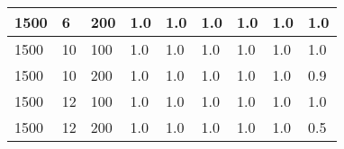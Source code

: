 \begin{table}[H]
\begin{tabular}{|l|l|l|l|l|l|l|l|l|}
1500                    & 6                      & 200                    & 1.0                        & 1.0                       & 1.0                             & 1.0                       & 1.0                           & 1.0                            \\ \hline
1500                    & 10                     & 100                    & 1.0                        & 1.0                       & 1.0                             & 1.0                       & 1.0                           & 1.0                            \\ \hline
1500                    & 10                     & 200                    & 1.0                        & 1.0                       & 1.0                             & 1.0                       & 1.0                           & 0.9                            \\ \hline
1500                    & 12                     & 100                    & 1.0                        & 1.0                       & 1.0                             & 1.0                       & 1.0                           & 1.0                            \\ \hline
1500                    & 12                     & 200                    & 1.0                        & 1.0                       & 1.0                             & 1.0                       & 1.0                           & 0.5                            \\ \hline
\end{tabular}
\end{table}
